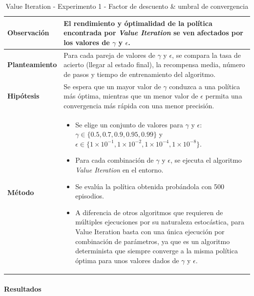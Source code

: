 \begin{table}[H]
    \centering
    \begin{tabularx}{\textwidth}{|p{4cm}|X|} %
        \hline %
        \textbf{Observación} & El rendimiento y óptimalidad de la política encontrada por \textit{Value Iteration} se ven afectados por los valores de $\gamma$ y $\epsilon$.
        \\ \hline
        \textbf{Planteamiento} & Para cada pareja de valores de $\gamma$ y $\epsilon$, se compara la tasa de acierto (llegar al estado final), la recompensa media, número de pasos y tiempo de entrenamiento del algoritmo.
        \\ \hline
        \textbf{Hipótesis} & Se espera que un mayor valor de $\gamma$ conduzca a una política más óptima, mientras que un menor valor de $\epsilon$ permita una convergencia más rápida con una menor precisión.
        \\ \hline
        \textbf{Método} & 
        \begin{itemize}
            \item Se elige un conjunto de valores para $\gamma$ y $\epsilon$: \(\gamma \in \{0.5, 0.7, 0.9, 0.95, 0.99\}\) y \(\epsilon \in \{1\times 10^{-1}, 1\times 10^{-2}, 1\times 10^{-4}, 1\times 10^{-8}\}\).
            \item Para cada combinación de \(\gamma\) y \(\epsilon\), se ejecuta el algoritmo \textit{Value Iteration} en el entorno.
            \item Se evalúa la política obtenida probándola con 500 episodios.
            \item A diferencia de otros algoritmos que requieren de múltiples ejecuciones por su naturaleza estocástica, para Value Iteration basta con una única ejecución por combinación de parámetros, ya que es un algoritmo determinista que siempre converge a la misma política óptima para unos valores dados de $\gamma$ y $\epsilon$.
        \end{itemize}
        \\ \hline
    \end{tabularx}
    \caption{Value Iteration - Experimento 1 - Factor de descuento \& umbral de convergencia}
    \label{tab:diseñoValueIterationExp1}
\end{table}

\newpage

\paragraph{Resultados}

